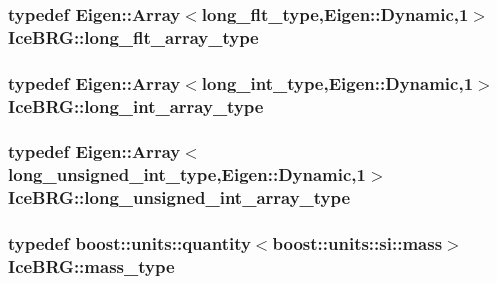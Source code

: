 \subsubsection[{long\+\_\+flt\+\_\+array\+\_\+type}]{\setlength{\rightskip}{0pt plus 5cm}typedef Eigen\+::\+Array$<${\bf long\+\_\+flt\+\_\+type},Eigen\+::\+Dynamic,1$>$ {\bf Ice\+B\+R\+G\+::long\+\_\+flt\+\_\+array\+\_\+type}}\label{namespaceIceBRG_a92601c7ccb2563723f800de23ba666a6}
\hypertarget{namespaceIceBRG_a17a6514be330cb5afcbb419e6c50e844}{}
\subsubsection[{long\+\_\+int\+\_\+array\+\_\+type}]{\setlength{\rightskip}{0pt plus 5cm}typedef Eigen\+::\+Array$<${\bf long\+\_\+int\+\_\+type},Eigen\+::\+Dynamic,1$>$ {\bf Ice\+B\+R\+G\+::long\+\_\+int\+\_\+array\+\_\+type}}\label{namespaceIceBRG_a17a6514be330cb5afcbb419e6c50e844}
\hypertarget{namespaceIceBRG_aceb755f0ad553ba8e208e6d6d3855c97}{}
\subsubsection[{long\+\_\+unsigned\+\_\+int\+\_\+array\+\_\+type}]{\setlength{\rightskip}{0pt plus 5cm}typedef Eigen\+::\+Array$<${\bf long\+\_\+unsigned\+\_\+int\+\_\+type},Eigen\+::\+Dynamic,1$>$ {\bf Ice\+B\+R\+G\+::long\+\_\+unsigned\+\_\+int\+\_\+array\+\_\+type}}\label{namespaceIceBRG_aceb755f0ad553ba8e208e6d6d3855c97}
\hypertarget{namespaceIceBRG_a1be72ac4918a9b029f2eefa084213e35}{}
\subsubsection[{mass\+\_\+type}]{\setlength{\rightskip}{0pt plus 5cm}typedef boost\+::units\+::quantity$<$boost\+::units\+::si\+::mass$>$ {\bf Ice\+B\+R\+G\+::mass\+\_\+type}}\label{namespaceIceBRG_a1be72ac4918a9b029f2eefa084213e35}
\hypertarget{namespaceIceBRG_a5dfb15d72d312a490f6e4db9e75f4359}{}
